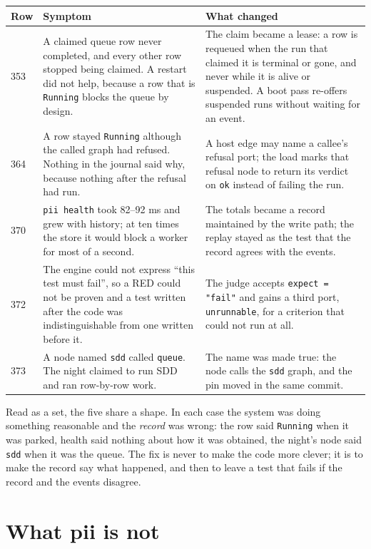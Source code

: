 \begin{longtable}{@{}p{}p{}p{}@{}}
	\toprule
	\textbf{Row} & \textbf{Symptom} & \textbf{What changed} \\
	\midrule
	\endhead
	353 & A claimed queue row never completed, and every other row stopped being claimed. A restart
	did not help, because a row that is \texttt{Running} blocks the queue by design. & The claim
	became a lease: a row is requeued when the run that claimed it is terminal or gone, and never
	while it is alive or suspended. A boot pass re-offers suspended runs without waiting for an
	event. \\
	364 & A row stayed \texttt{Running} although the called graph had refused. Nothing in the journal
	said why, because nothing after the refusal had run. & A host edge may name a callee's refusal
	port; the load marks that refusal node to return its verdict on \texttt{ok} instead of failing
	the run. \\
	370 & \texttt{pii health} took 82--92 ms and grew with history; at ten times the store it would
	block a worker for most of a second. & The totals became a record maintained by the write path;
	the replay stayed as the test that the record agrees with the events. \\
	372 & The engine could not express \enquote{this test must fail}, so a RED could not be proven
	and a test written after the code was indistinguishable from one written before it. & The judge
	accepts \texttt{expect = "fail"} and gains a third port, \texttt{unrunnable}, for a criterion
	that could not run at all. \\
	373 & A node named \texttt{sdd} called \texttt{queue}. The night claimed to run SDD and ran
	row-by-row work. & The name was made true: the node calls the \texttt{sdd} graph, and the pin
	moved in the same commit. \\
	\bottomrule
\end{longtable}

Read as a set, the five share a shape. In each case the system was doing something reasonable and
the \emph{record} was wrong: the row said \texttt{Running} when it was parked, health said nothing
about how it was obtained, the night's node said \texttt{sdd} when it was the queue. The fix is
never to make the code more clever; it is to make the record say what happened, and then to leave a
test that fails if the record and the events disagree.

\section{What pii is not}

